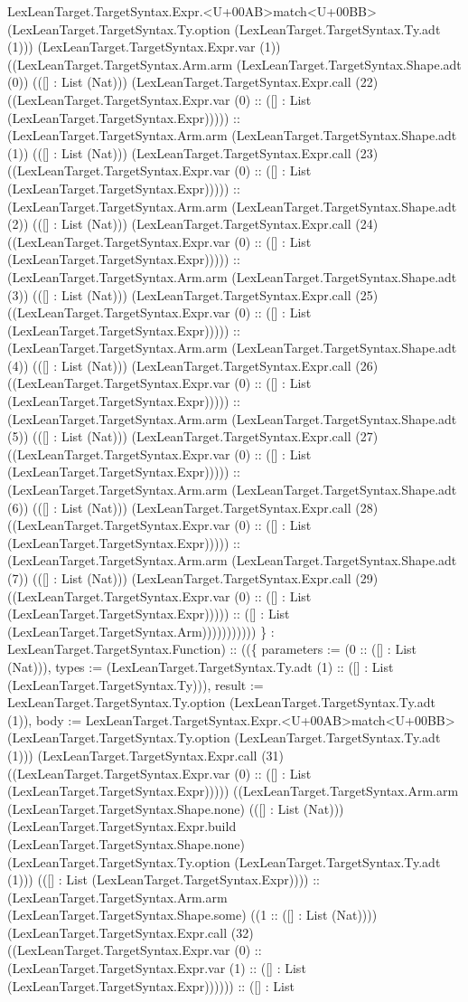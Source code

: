 \documentclass[11pt]{article}
\begin{document}
LexLeanTarget.TargetSyntax.Expr.<U+00AB>match<U+00BB> (LexLeanTarget.TargetSyntax.Ty.option (LexLeanTarget.TargetSyntax.Ty.adt (1))) (LexLeanTarget.TargetSyntax.Expr.var (1)) ((LexLeanTarget.TargetSyntax.Arm.arm (LexLeanTarget.TargetSyntax.Shape.adt (0)) (([] : List (Nat))) (LexLeanTarget.TargetSyntax.Expr.call (22) ((LexLeanTarget.TargetSyntax.Expr.var (0) :: ([] : List (LexLeanTarget.TargetSyntax.Expr))))) :: (LexLeanTarget.TargetSyntax.Arm.arm (LexLeanTarget.TargetSyntax.Shape.adt (1)) (([] : List (Nat))) (LexLeanTarget.TargetSyntax.Expr.call (23) ((LexLeanTarget.TargetSyntax.Expr.var (0) :: ([] : List (LexLeanTarget.TargetSyntax.Expr))))) :: (LexLeanTarget.TargetSyntax.Arm.arm (LexLeanTarget.TargetSyntax.Shape.adt (2)) (([] : List (Nat))) (LexLeanTarget.TargetSyntax.Expr.call (24) ((LexLeanTarget.TargetSyntax.Expr.var (0) :: ([] : List (LexLeanTarget.TargetSyntax.Expr))))) :: (LexLeanTarget.TargetSyntax.Arm.arm (LexLeanTarget.TargetSyntax.Shape.adt (3)) (([] : List (Nat))) (LexLeanTarget.TargetSyntax.Expr.call (25) ((LexLeanTarget.TargetSyntax.Expr.var (0) :: ([] : List (LexLeanTarget.TargetSyntax.Expr))))) :: (LexLeanTarget.TargetSyntax.Arm.arm (LexLeanTarget.TargetSyntax.Shape.adt (4)) (([] : List (Nat))) (LexLeanTarget.TargetSyntax.Expr.call (26) ((LexLeanTarget.TargetSyntax.Expr.var (0) :: ([] : List (LexLeanTarget.TargetSyntax.Expr))))) :: (LexLeanTarget.TargetSyntax.Arm.arm (LexLeanTarget.TargetSyntax.Shape.adt (5)) (([] : List (Nat))) (LexLeanTarget.TargetSyntax.Expr.call (27) ((LexLeanTarget.TargetSyntax.Expr.var (0) :: ([] : List (LexLeanTarget.TargetSyntax.Expr))))) :: (LexLeanTarget.TargetSyntax.Arm.arm (LexLeanTarget.TargetSyntax.Shape.adt (6)) (([] : List (Nat))) (LexLeanTarget.TargetSyntax.Expr.call (28) ((LexLeanTarget.TargetSyntax.Expr.var (0) :: ([] : List (LexLeanTarget.TargetSyntax.Expr))))) :: (LexLeanTarget.TargetSyntax.Arm.arm (LexLeanTarget.TargetSyntax.Shape.adt (7)) (([] : List (Nat))) (LexLeanTarget.TargetSyntax.Expr.call (29) ((LexLeanTarget.TargetSyntax.Expr.var (0) :: ([] : List (LexLeanTarget.TargetSyntax.Expr))))) :: ([] : List (LexLeanTarget.TargetSyntax.Arm))))))))))) \} : LexLeanTarget.TargetSyntax.Function) :: ((\{ parameters := (0 :: ([] : List (Nat))), types := (LexLeanTarget.TargetSyntax.Ty.adt (1) :: ([] : List (LexLeanTarget.TargetSyntax.Ty))), result := LexLeanTarget.TargetSyntax.Ty.option (LexLeanTarget.TargetSyntax.Ty.adt (1)), body := LexLeanTarget.TargetSyntax.Expr.<U+00AB>match<U+00BB> (LexLeanTarget.TargetSyntax.Ty.option (LexLeanTarget.TargetSyntax.Ty.adt (1))) (LexLeanTarget.TargetSyntax.Expr.call (31) ((LexLeanTarget.TargetSyntax.Expr.var (0) :: ([] : List (LexLeanTarget.TargetSyntax.Expr))))) ((LexLeanTarget.TargetSyntax.Arm.arm (LexLeanTarget.TargetSyntax.Shape.none) (([] : List (Nat))) (LexLeanTarget.TargetSyntax.Expr.build (LexLeanTarget.TargetSyntax.Shape.none) (LexLeanTarget.TargetSyntax.Ty.option (LexLeanTarget.TargetSyntax.Ty.adt (1))) (([] : List (LexLeanTarget.TargetSyntax.Expr)))) :: (LexLeanTarget.TargetSyntax.Arm.arm (LexLeanTarget.TargetSyntax.Shape.some) ((1 :: ([] : List (Nat)))) (LexLeanTarget.TargetSyntax.Expr.call (32) ((LexLeanTarget.TargetSyntax.Expr.var (0) :: (LexLeanTarget.TargetSyntax.Expr.var (1) :: ([] : List (LexLeanTarget.TargetSyntax.Expr)))))) :: ([] : List 
\end{document}

